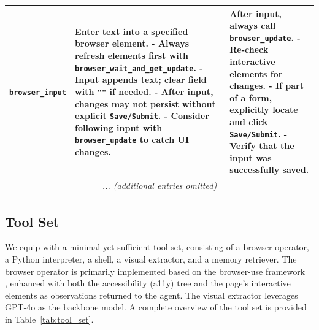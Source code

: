 \begin{table}[htbp]
\begin{tabular}{l|p{5cm}|p{4cm}}
\midrule
\texttt{browser\_input} &
Enter text into a specified browser element.  
- Always refresh elements first with \texttt{browser\_wait\_and\_get\_update}.  
- Input \textbf{appends} text; clear field with \texttt{""} if needed.  
- After input, changes may not persist without explicit \texttt{Save/Submit}.  
- Consider following input with \texttt{browser\_update} to catch UI changes. &
After input, always call \texttt{browser\_update}.  
- Re-check interactive elements for changes.  
- If part of a form, explicitly locate and click \texttt{Save/Submit}.  
- Verify that the input was successfully saved. \\
\midrule
\multicolumn{3}{c}{\textit{... (additional entries omitted)}} \\
\bottomrule
\end{tabular}
\end{table}

\newpage
\subsection{Tool Set}
\label{app:tool_set}

We equip {\method} with a minimal yet sufficient tool set, consisting of a browser operator, a Python interpreter, a shell, a visual extractor, and a memory retriever. 
The browser operator is primarily implemented based on the browser-use framework~\cite{browseruse2025browseruse} , enhanced with both the accessibility (a11y) tree and the page’s interactive elements as observations returned to the agent. 
The visual extractor leverages GPT-4o as the backbone model. 
A complete overview of the tool set is provided in Table~\ref{tab:tool_set}.

